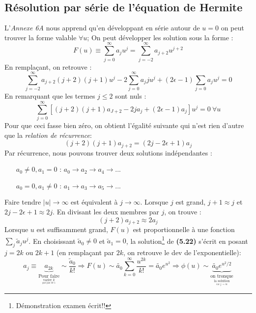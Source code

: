 \documentclass[british,french,11pt, a4paper, openany]{book}
\begin{document}
	\subsection{Résolution par série de l'équation de Hermite}
	L'\textit{Annexe 6A} nous apprend qu'en développant en série autour de $u=0$ on peut trouver la forme valable $\forall  u$; On peut développer les solution sous la forme :
	\begin{equation}
		F(u) \equiv \sum_{j=0}^\infty a_ju^j = \sum_{j=-2}^\infty a_{j+2}u^{j+2}
	\end{equation}
	En remplaçant, on retrouve :
	\begin{equation}
		\sum_{j=-2}^\infty a_{j+2}(j+2)(j+1)u^j - 2\sum_{j=0}^\infty a_jju^j + (2\epsilon-1)\sum_{j=0} a_ju^j = 0
	\end{equation}
	En remarquant que les termes $j \leq 2$ sont nuls :
	\begin{equation}
		\sum_{j=0}^\infty\left[ (j+2)(j+1)a_{J+2} - 2ja_j + (2\epsilon - 1)a_j \right]u^j = 0\ \forall u
	\end{equation}
	Pour que ceci fasse bien zéro, on obtient l'égalité suivante qui n'est rien d'autre que la \textit{relation de récurrence}:
	\begin{equation}\label{eq:5.21}
		(j+2)(j+1)a_{j+2} = (2j-2\epsilon+1)a_j
	\end{equation}
	Par récurrence, nous pouvons trouver deux solutions indépendantes :
	\begin{itemize}
		\item[$a_0 \neq 0, a_1 = 0$] : $a_0 \rightarrow a_2 \rightarrow a_4 \rightarrow ...$
		\item[$a_0 = 0, a_1 \neq 0$] : $a_1 \rightarrow a_3 \rightarrow a_5 \rightarrow ...$
	\end{itemize}
	Faire tendre $|u| \rightarrow \infty$ est équivalent à $j \rightarrow \infty$. Lorsque $j$ est grand, $j+1 \approx j$ et $2j-2\epsilon + 1 \approx 2j$. En divisant les deux membres par $j$, on trouve :
	\begin{equation}
		(j+2)a_{j+2} \approx 2a_j
	\end{equation}
	Lorsque $u$ est suffisamment grand, $F(u)$ est proportionnelle à une fonction $\sum_j \tilde{a}_ju^j$. En choisissant $\tilde{a}_0 \neq 0$ et $\tilde{a}_1 = 0$, la solution\footnote{Démonstration examen écrit!!} de \textbf{(5.22)} s'écrit en posant $j = 2k$ ou $2k+1$ (en remplaçant par $2k$, on retrouve le dev de l'exponentielle):
	\begin{equation}
		a_j \equiv \underbrace{a_{2k}}_{\underset{\underset{\text{par pas de 1}}{\text{varier $k$}}}{\text{Pour faire}}} \sim \frac{\tilde{a}_0}{k!} \Rightarrow F(u) \sim  \tilde{a_0}\sum_{k=0}^\infty \frac{u^{2k}}{k!} = \tilde{a_0}e^{u^2} \Rightarrow \phi(u) \sim \underbrace{\tilde{a_0}e^{u^2/2}}_{\underset{\underset{\text{car $j\rightarrow\infty$}}{\text{la solution}}}{\text{on tronque}}}
	\end{equation}
\end{document}
